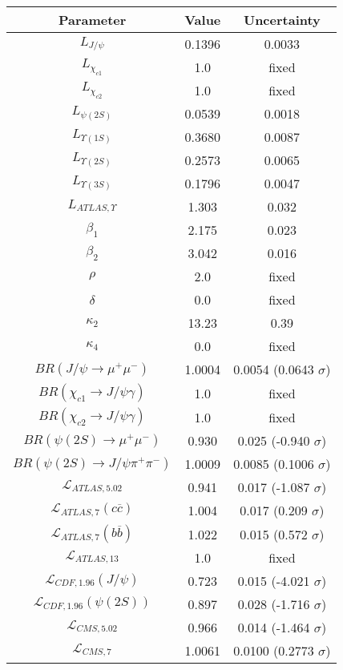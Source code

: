 \begin{table}[h!]
\centering
\begin{tabular}{c|c|c}
Parameter & Value & Uncertainty \\
\hline
$L_{J/\psi}$ & 0.1396 & 0.0033 \\
$L_{\chi_{c1}}$ & 1.0 & fixed \\
$L_{\chi_{c2}}$ & 1.0 & fixed \\
$L_{\psi(2S)}$ & 0.0539 & 0.0018 \\
$L_{\Upsilon(1S)}$ & 0.3680 & 0.0087 \\
$L_{\Upsilon(2S)}$ & 0.2573 & 0.0065 \\
$L_{\Upsilon(3S)}$ & 0.1796 & 0.0047 \\
$L_{ATLAS,\Upsilon}$ & 1.303 & 0.032 \\
$\beta_1$ & 2.175 & 0.023 \\
$\beta_2$ & 3.042 & 0.016 \\
$\rho$ & 2.0 & fixed \\
$\delta$ & 0.0 & fixed \\
$\kappa_2$ & 13.23 & 0.39 \\
$\kappa_4$ & 0.0 & fixed \\
$BR(J/\psi\rightarrow\mu^+\mu^-)$ & 1.0004 & 0.0054 (0.0643 $\sigma$) \\
$BR(\chi_{c1}\rightarrow J/\psi\gamma)$ & 1.0 & fixed \\
$BR(\chi_{c2}\rightarrow J/\psi\gamma)$ & 1.0 & fixed \\
$BR(\psi(2S)\rightarrow\mu^+\mu^-)$ & 0.930 & 0.025 (-0.940 $\sigma$) \\
$BR(\psi(2S)\rightarrow J/\psi\pi^+\pi^-)$ & 1.0009 & 0.0085 (0.1006 $\sigma$) \\
$\mathcal L_{ATLAS,5.02}$ & 0.941 & 0.017 (-1.087 $\sigma$) \\
$\mathcal L_{ATLAS,7}(c\overline c)$ & 1.004 & 0.017 (0.209 $\sigma$) \\
$\mathcal L_{ATLAS,7}(b\overline b)$ & 1.022 & 0.015 (0.572 $\sigma$) \\
$\mathcal L_{ATLAS,13}$ & 1.0 & fixed \\
$\mathcal L_{CDF,1.96}(J/\psi)$ & 0.723 & 0.015 (-4.021 $\sigma$) \\
$\mathcal L_{CDF,1.96}(\psi(2S))$ & 0.897 & 0.028 (-1.716 $\sigma$) \\
$\mathcal L_{CMS,5.02}$ & 0.966 & 0.014 (-1.464 $\sigma$) \\
$\mathcal L_{CMS,7}$ & 1.0061 & 0.0100 (0.2773 $\sigma$) \\

\end{tabular}
\end{table}
